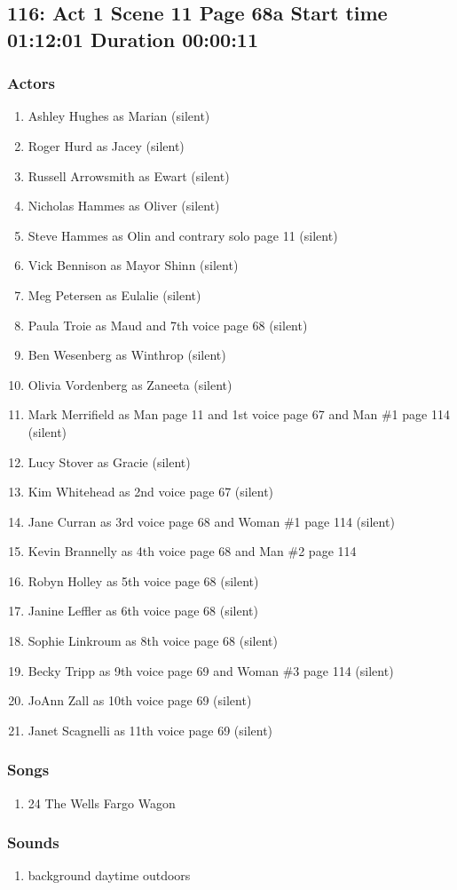 \subsection{116: Act 1 Scene 11 Page 68a Start time 01:12:01 Duration 00:00:11}

\subsubsection{Actors}
\begin{enumerate}
\item Ashley Hughes as Marian (silent)
\item Roger Hurd as Jacey (silent)
\item Russell Arrowsmith as Ewart (silent)
\item Nicholas Hammes as Oliver (silent)
\item Steve Hammes as Olin and contrary solo page 11 (silent)
\item Vick Bennison as Mayor Shinn (silent)
\item Meg Petersen as Eulalie (silent)
\item Paula Troie as Maud and 7th voice page 68 (silent)
\item Ben Wesenberg as Winthrop (silent)
\item Olivia Vordenberg as Zaneeta (silent)
\item Mark Merrifield as Man page 11 and 1st voice page 67 and Man \#1 page 114 (silent)
\item Lucy Stover as Gracie (silent)
\item Kim Whitehead as 2nd voice page 67 (silent)
\item Jane Curran as 3rd voice page 68 and Woman \#1 page 114 (silent)
\item Kevin Brannelly as 4th voice page 68 and Man \#2 page 114
\item Robyn Holley as 5th voice page 68 (silent)
\item Janine Leffler as 6th voice page 68 (silent)
\item Sophie Linkroum as 8th voice page 68 (silent)
\item Becky Tripp as 9th voice page 69 and Woman \#3 page 114 (silent)
\item JoAnn Zall as 10th voice page 69 (silent)
\item Janet Scagnelli as 11th voice page 69 (silent)
\end{enumerate}

\subsubsection{Songs}
\begin{enumerate}
\item 24 The Wells Fargo Wagon
\end{enumerate}\subsubsection{Sounds}
\begin{enumerate}
\item background daytime outdoors
\end{enumerate}
